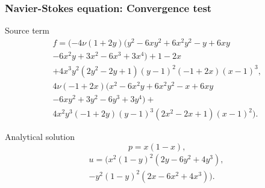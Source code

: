 \documentclass{beamer}
\begin{document}
\begin{frame}
\frametitle{Navier-Stokes equation: Convergence test}
\begin{block}{Source term}
\begin{equation}
\begin{split}
f = (-4 \nu (1+2y) (y^2 - 6xy^2 + 6x^2 y^2 - y + 6xy \\ - 6x^2 y + 3x^2 - 6x^3 + 3x^4)+ 1 - 2x \\+ 4x^3 y^2 (2y^2 - 2y + 1)(y - 1)^2 (-1 + 2x)(x - 1)^3 \textrm{,}\\ 4 \nu (-1 + 2x)(x^2 - 6x^2 y + 6x^2 y^2 - x + 6xy \\ - 6xy^2 + 3y^2 - 6y^3 + 3y^4) + \\ 4x^2y^3 (-1+2y)(y-1)^3 (2x^2-2x+1)(x-1)^2) \textrm{.}
\end{split}
\end{equation}
\end{block}
\begin{block}{Analytical solution}
\begin{equation}
p = x(1 - x) \textrm{,}
\end{equation}
\begin{equation} 
\begin{split}
u = (x^2(1-y)^2(2y-6y^2+4y^3),\\-y^2(1-y)^2(2x-6x^2+4x^3)) \textrm{.}
\end{split}
\end{equation}
\end{block}
\end{frame}
\end{document}

